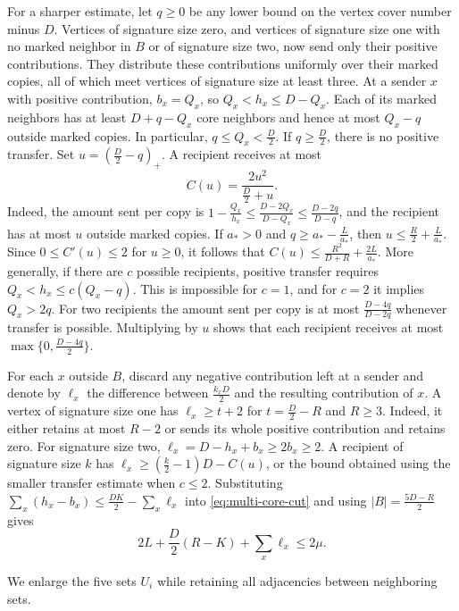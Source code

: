 \documentclass[preprint,11pt,numbers]{elsarticle-arxiv}
\numberwithin{equation}{section}
\theoremstyle{definition}
\begin{document}
For a sharper estimate, let $q\ge0$ be any lower bound on the vertex
cover number minus $D$. Vertices of signature size zero, and vertices
of signature size one with no marked neighbor in $B$ or of signature
size two, now send only their positive contributions. They distribute
these contributions uniformly over their marked copies, all of which
meet vertices of signature size at least three. At a sender $x$ with
positive contribution, $b_x=Q_x$, so $Q_x<h_x\le D-Q_x$.
Each of its marked neighbors has at least $D+q-Q_x$ core neighbors
and hence at most $Q_x-q$ outside marked copies. In particular,
$q\le Q_x<\frac{D}{2}$. If $q\ge\frac{D}{2}$, there is no positive
transfer. Set $u=(\frac{D}{2}-q)_+$. A recipient receives at most
\[
 C(u)=\frac{2u^2}{\frac{D}{2}+u}.
\]
Indeed, the amount sent per copy is
$1-\frac{Q_x}{h_x}\le\frac{D-2Q_x}{D-Q_x}\le\frac{D-2q}{D-q}$,
and the recipient has at most $u$ outside marked copies. If $a_*>0$
and $q\ge a_*-\frac{L}{a_*}$, then $u\le\frac{R}{2}+\frac{L}{a_*}$.
Since $0\le C'(u)\le2$ for $u\ge0$, it follows that
$C(u)\le\frac{R^2}{D+R}+\frac{2L}{a_*}$.
More generally, if there are $c$ possible recipients, positive
transfer requires $Q_x<h_x\le c(Q_x-q)$. This is impossible for $c=1$,
and for $c=2$ it implies $Q_x>2q$. For two recipients the amount
sent per copy is at most $\frac{D-4q}{D-2q}$ whenever transfer
is possible. Multiplying by $u$ shows that each recipient receives
at most $\max\{0,\frac{D-4q}{2}\}$.

For each $x$ outside $B$, discard any negative contribution left
at a sender and denote by $\ell_x$ the difference between
$\frac{k_xD}{2}$ and the resulting contribution of $x$.
A vertex of signature size one has $\ell_x\ge t+2$ for
$t=\frac{D}{2}-R$ and $R\ge3$. Indeed, it either retains at most
$R-2$ or sends its whole positive contribution and retains zero.
For signature size two, $\ell_x=D-h_x+b_x\ge2b_x\ge2$.
A recipient of signature size $k$ has
$\ell_x\ge(\frac{k}{2}-1)D-C(u)$, or the bound obtained using the
smaller transfer estimate when $c\le2$. Substituting
$\sum_x(h_x-b_x)\le\frac{DK}{2}-\sum_x\ell_x$ into
\eqref{eq:multi-core-cut} and using $|B|=\frac{5D-R}{2}$ gives
\begin{equation}\label{eq:multi-loss-budget}
 2L+\frac{D}{2}(R-K)+\sum_x\ell_x\le2\mu.
\end{equation}

We enlarge the five sets $U_i$ while retaining all adjacencies between neighboring sets.
\end{document}
